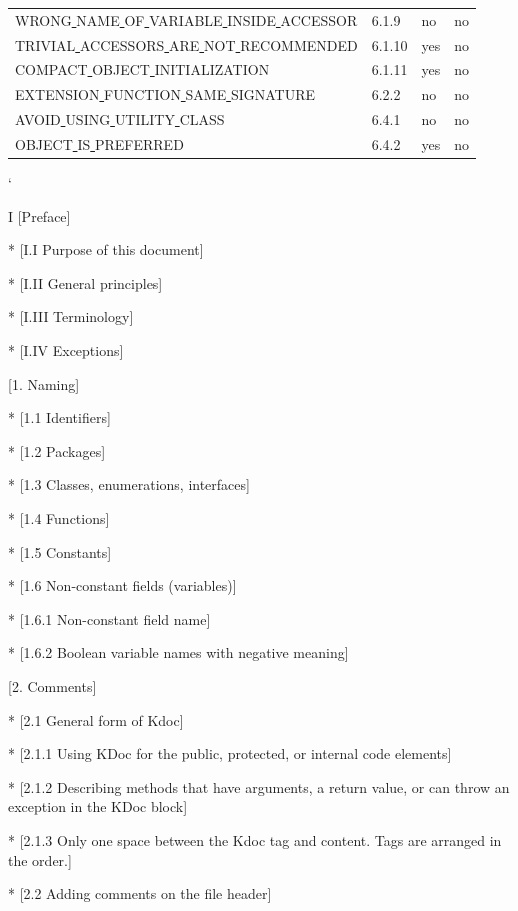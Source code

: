 \begin{longtable}{ |l|p{0.8cm}|p{0.8cm}| p{3cm} | }
WRONG\underline{ }NAME\underline{ }OF\underline{ }VARIABLE\underline{ }INSIDE\underline{ }ACCESSOR & 6.1.9 &  no  &   no \\
TRIVIAL\underline{ }ACCESSORS\underline{ }ARE\underline{ }NOT\underline{ }RECOMMENDED & 6.1.10 &  yes  &   no  \\
COMPACT\underline{ }OBJECT\underline{ }INITIALIZATION & 6.1.11 &  yes  &   no  \\
EXTENSION\underline{ }FUNCTION\underline{ }SAME\underline{ }SIGNATURE & 6.2.2 &  no  &   no  \\
AVOID\underline{ }USING\underline{ }UTILITY\underline{ }CLASS & 6.4.1 &  no  &  no \\
OBJECT\underline{ }IS\underline{ }PREFERRED & 6.4.2 &  yes  &  no \\
\hline
\end{longtable}
\lstMakeShortInline[basicstyle=\ttfamily\bfseries]`

I [Preface]

* [I.I Purpose of this document]

* [I.II General principles]

* [I.III Terminology]

* [I.IV Exceptions]



[1. Naming]



* [1.1 Identifiers]

* [1.2 Packages]

* [1.3 Classes, enumerations, interfaces]

* [1.4 Functions]

* [1.5 Constants]

* [1.6 Non-constant fields (variables)]

    * [1.6.1 Non-constant field name]

    * [1.6.2 Boolean variable names with negative meaning]



[2. Comments]

* [2.1 General form of Kdoc]

    * [2.1.1 Using KDoc for the public, protected, or internal code elements]

    * [2.1.2 Describing methods that have arguments, a return value, or can throw an exception in the KDoc block]

    * [2.1.3 Only one space between the Kdoc tag and content. Tags are arranged in the order.]

* [2.2 Adding comments on the file header]

